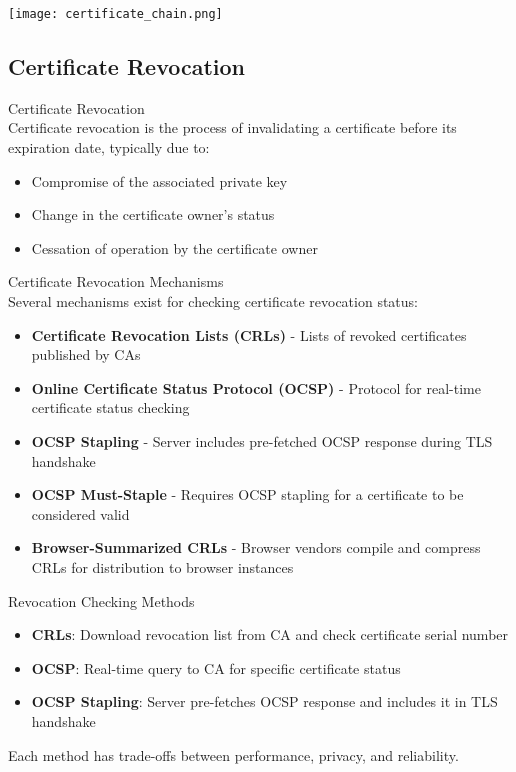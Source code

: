 \texttt{[image: certificate\_chain.png]}









\subsection{Certificate Revocation}

\begin{definition}{Certificate Revocation}\\
Certificate revocation is the process of invalidating a certificate before its expiration date, typically due to:
\begin{itemize}
    \item Compromise of the associated private key
    \item Change in the certificate owner's status
    \item Cessation of operation by the certificate owner
\end{itemize}
\end{definition}

\begin{concept}{Certificate Revocation Mechanisms}\\
Several mechanisms exist for checking certificate revocation status:
\begin{itemize}
    \item \textbf{Certificate Revocation Lists (CRLs)} - Lists of revoked certificates published by CAs
    \item \textbf{Online Certificate Status Protocol (OCSP)} - Protocol for real-time certificate status checking
    \item \textbf{OCSP Stapling} - Server includes pre-fetched OCSP response during TLS handshake
    \item \textbf{OCSP Must-Staple} - Requires OCSP stapling for a certificate to be considered valid
    \item \textbf{Browser-Summarized CRLs} - Browser vendors compile and compress CRLs for distribution to browser instances
\end{itemize}
\end{concept}

\begin{concept}{Revocation Checking Methods}
\begin{itemize}
    \item \textbf{CRLs}: Download revocation list from CA and check certificate serial number
    \item \textbf{OCSP}: Real-time query to CA for specific certificate status
    \item \textbf{OCSP Stapling}: Server pre-fetches OCSP response and includes it in TLS handshake
\end{itemize}
Each method has trade-offs between performance, privacy, and reliability.
\end{concept}

